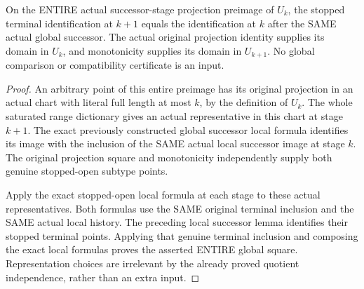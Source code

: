 \begin{theorem}
\label{hir:sharp-actual-curve-stopped-open-successor-square}
\leanok
On the ENTIRE actual successor-stage projection preimage of $U_k$, the
stopped terminal identification at $k+1$ equals the identification at $k$
after the SAME actual global successor. The actual original projection
identity supplies its domain in $U_k$, and monotonicity supplies its
domain in $U_{k+1}$. No global comparison or compatibility certificate is
an input.
\end{theorem}
\begin{proof}
An arbitrary point of this entire preimage has its original projection in
an actual chart with literal full length at most $k$, by the definition of
$U_k$. The whole saturated range dictionary gives an actual representative
in this chart at stage $k+1$. The exact previously constructed global
successor local formula identifies its image with the inclusion of the
SAME actual local successor image at stage $k$. The original projection
square and monotonicity independently supply both genuine stopped-open
subtype points.

Apply the exact stopped-open local formula at each stage to these actual
representatives. Both formulas use the SAME original terminal inclusion
and the SAME actual local history. The preceding local successor lemma
identifies their stopped terminal points. Applying that genuine terminal
inclusion and composing the exact local formulas proves the asserted
ENTIRE global square. Representation choices are irrelevant by the
already proved quotient independence, rather than an extra input.
\end{proof}

